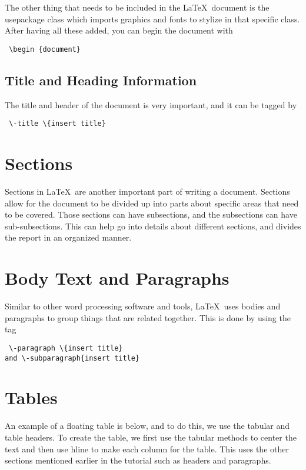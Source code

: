 \documentclass[12pt,journal,compsoc]{IEEEtran}
\begin{document}
The other thing that needs to be included in the \LaTeX\ document is the usepackage{} class which imports graphics and fonts to stylize in that specific class. After having all these added, you can begin the document with \begin{verbatim} \begin {document} \end{verbatim}

\subsection{Title and Heading Information}
The title and header of the document is very important, and it can be tagged by \begin{verbatim} \-title \{insert title} \end{verbatim}
\section{Sections}
Sections in \LaTeX\ are another important part of writing a document. Sections allow for the document to be divided up into parts about specific areas that need to be covered. Those sections can have subsections, and the subsections can have sub-subsections. This can help go into details about different sections, and divides the report in an organized manner.
\section{Body Text and Paragraphs}
Similar to other word processing software and tools, \LaTeX\ uses bodies and paragraphs to group things that are related together. This is done by using the tag \begin{verbatim} \-paragraph \{insert title}
and \-subparagraph{insert title} \end{verbatim}
\section{Tables}
An example of a floating table is below, and to do this, we use the tabular and table headers. To create the table, we first use the tabular methods to center the text and then use hline to make each column for the table. This uses the other sections mentioned earlier in the tutorial such as headers and paragraphs.
\end{document}
